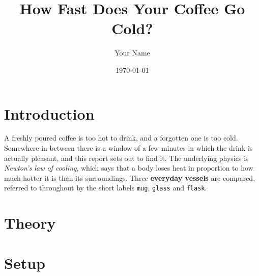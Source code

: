\documentclass[a4paper,11pt]{article}
\title{How Fast Does Your Coffee Go Cold?}
\author{Your Name}
\date{\today}
\begin{document}
\maketitle
\tableofcontents

\section{Introduction}\label{sec:introduction}

A freshly poured coffee is too hot to drink, and a forgotten one is too cold.
Somewhere in between there is a window of a few minutes in which the drink is actually pleasant,
and this report sets out to find it.
The underlying physics is \emph{Newton's law of cooling},
which says that a body loses heat in proportion to how much hotter it is than its surroundings.
Three \textbf{everyday vessels} are compared,
referred to throughout by the short labels \texttt{mug}, \texttt{glass} and \texttt{flask}.



\section{Theory}\label{sec:theory}


\section{Setup}\label{sec:setup}
\end{document}

